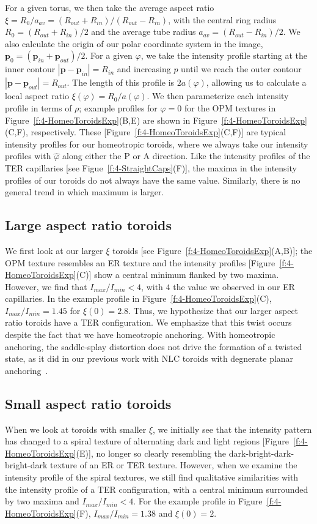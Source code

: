 For a given torus, we then take the average aspect ratio $\xi = R_0/a_{av} = (R_{out}+R_{in})/(R_{out}-R_{in})$, with the central ring radius $R_0=(R_{out}+R_{in})/2$ and the average tube radius $a_{av} = (R_{out}-R_{in})/2$.
We also calculate the origin of our polar coordinate system in the image, $\mathbf{p}_0 = (\mathbf{p}_{in}+\mathbf{p}_{out})/2$.
For a given $\varphi$, we take the intensity profile starting at the inner contour $|\mathbf{p}-\mathbf{p}_{in}| = R_{in}$ and increasing $p$ until we reach the outer contour $|\mathbf{p}-\mathbf{p}_{out}| = R_{out}$.
The length of this profile is $2 a(\varphi)$, allowing us to calculate a local aspect ratio $\xi(\varphi) = R_0/a(\varphi)$.
We then parameterize each intensity profile in terms of $\rho$; example profiles for $\varphi = 0$ for the OPM textures  in Figure~\ref{f:4-HomeoToroidsExp}(B,E) are shown in Figure~\ref{f:4-HomeoToroidsExp}(C,F), respectively.
These [Figure~\ref{f:4-HomeoToroidsExp}(C,F)] are typical intensity profiles for our homeotropic toroids, where we always take our intensity profiles with $\hat{\varphi}$ along either the P or A direction.
Like the intensity profiles of the TER capillaries [see Figue~\ref{f:4-StraightCaps}(F)], the maxima in the intensity profiles of our toroids do not always have the same value.
Similarly, there is no general trend in which maximum is larger.


\subsection{Large aspect ratio toroids}
We first look at our larger $\xi$ toroids [see Figure~\ref{f:4-HomeoToroidsExp}(A,B)]; the OPM texture resembles an ER texture and the intensity profiles [Figure~\ref{f:4-HomeoToroidsExp}(C)] show a central minimum flanked by two maxima.
However, we find that $I_{max}/I_{min} < 4$, with $4$ the value we observed in our ER capillaries.
In the example profile in Figure~\ref{f:4-HomeoToroidsExp}(C), $I_{max}/I_{min} = 1.45$ for $\xi(0) = 2.8$.
Thus, we hypothesize that our larger aspect ratio toroids have a TER configuration.
We emphasize that this twist occurs despite the fact that we have homeotropic anchoring.
With homeotropic anchoring, the saddle-splay distortion does not drive the formation of a twisted state, as it did in our previous work with NLC toroids with degnerate planar anchoring~\cite{RN24}.


\subsection{Small aspect ratio toroids}
When we look at toroids with smaller $\xi$, we initially see that the intensity pattern has changed to a spiral texture of alternating dark and light regions [Figure~\ref{f:4-HomeoToroidsExp}(E)], no longer so clearly resembling the dark-bright-dark-bright-dark texture of an ER or TER texture.
However, when we examine the intensity profile of the spiral textures, we still find qualitative similarities with the intensity profile of a TER configuration, with a central minimum surrounded by two maxima and $I_{max}/I_{min} < 4$.
For the example profile in Figure~\ref{f:4-HomeoToroidsExp}(F), $I_{max}/I_{min} =1.38$ and $\xi(0) = 2$.


